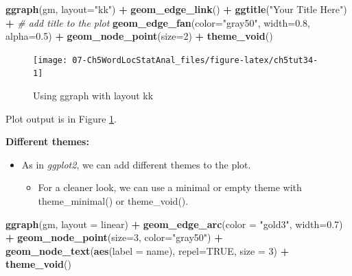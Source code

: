 \documentclass[
]{article}
\newenvironment{Shaded}{\begin{snugshade}}{\end{snugshade}}
\newcommand{\AttributeTok}[1]{\textcolor[rgb]{0.13,0.29,0.53}{#1}}
\newcommand{\CommentTok}[1]{\textcolor[rgb]{0.56,0.35,0.01}{\textit{#1}}}
\newcommand{\ConstantTok}[1]{\textcolor[rgb]{0.56,0.35,0.01}{#1}}
\newcommand{\DecValTok}[1]{\textcolor[rgb]{0.00,0.00,0.81}{#1}}
\newcommand{\FloatTok}[1]{\textcolor[rgb]{0.00,0.00,0.81}{#1}}
\newcommand{\FunctionTok}[1]{\textcolor[rgb]{0.13,0.29,0.53}{\textbf{#1}}}
\newcommand{\NormalTok}[1]{#1}
\newcommand{\SpecialCharTok}[1]{\textcolor[rgb]{0.81,0.36,0.00}{\textbf{#1}}}
\newcommand{\StringTok}[1]{\textcolor[rgb]{0.31,0.60,0.02}{#1}}
\providecommand{\tightlist}{%
  \setlength{\itemsep}{0pt}\setlength{\parskip}{0pt}}
\begin{document}
\begin{Shaded}
\begin{Highlighting}[]
\FunctionTok{ggraph}\NormalTok{(gm, }\AttributeTok{layout=}\StringTok{"kk"}\NormalTok{) }\SpecialCharTok{+}
  \FunctionTok{geom\_edge\_link}\NormalTok{() }\SpecialCharTok{+}
  \FunctionTok{ggtitle}\NormalTok{(}\StringTok{"Your Title Here"}\NormalTok{) }\SpecialCharTok{+}  \CommentTok{\# add title to the plot}
  \FunctionTok{geom\_edge\_fan}\NormalTok{(}\AttributeTok{color=}\StringTok{"gray50"}\NormalTok{, }\AttributeTok{width=}\FloatTok{0.8}\NormalTok{, }\AttributeTok{alpha=}\FloatTok{0.5}\NormalTok{) }\SpecialCharTok{+} 
  \FunctionTok{geom\_node\_point}\NormalTok{(}\AttributeTok{size=}\DecValTok{2}\NormalTok{) }\SpecialCharTok{+}
  \FunctionTok{theme\_void}\NormalTok{()}
\end{Highlighting}
\end{Shaded}

\begin{figure}

{\centering \texttt{[image: 07-Ch5WordLocStatAnal\_files/figure-latex/ch5tut34-1]} 

}

\caption{Using ggraph with layout kk}\label{fig:ch5tut34}
\end{figure}

Plot output is in Figure \ref{fig:ch5tut34}.

\textbf{Different themes:}

\begin{itemize}
\tightlist
\item
  As in \emph{ggplot2}, we can add different themes to the plot.

  \begin{itemize}
  \tightlist
  \item
    For a cleaner look, we can use a minimal or empty theme with theme\_minimal() or theme\_void().
  \end{itemize}
\end{itemize}

\begin{Shaded}
\begin{Highlighting}[]
\FunctionTok{ggraph}\NormalTok{(gm, }\AttributeTok{layout =} \StringTok{\textquotesingle{}linear\textquotesingle{}}\NormalTok{) }\SpecialCharTok{+} 
    \FunctionTok{geom\_edge\_arc}\NormalTok{(}\AttributeTok{color =} \StringTok{"gold3"}\NormalTok{, }\AttributeTok{width=}\FloatTok{0.7}\NormalTok{) }\SpecialCharTok{+}
    \FunctionTok{geom\_node\_point}\NormalTok{(}\AttributeTok{size=}\DecValTok{3}\NormalTok{, }\AttributeTok{color=}\StringTok{"gray50"}\NormalTok{) }\SpecialCharTok{+}
    \FunctionTok{geom\_node\_text}\NormalTok{(}\FunctionTok{aes}\NormalTok{(}\AttributeTok{label =}\NormalTok{ name), }\AttributeTok{repel=}\ConstantTok{TRUE}\NormalTok{, }\AttributeTok{size =} \DecValTok{3}\NormalTok{) }\SpecialCharTok{+}
    \FunctionTok{theme\_void}\NormalTok{()}
\end{Highlighting}
\end{Shaded}
\end{document}
